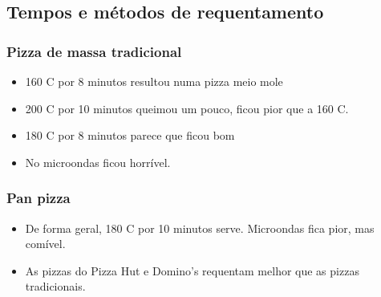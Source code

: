\subsection*{Tempos e métodos de requentamento}

\subsubsection*{Pizza de massa tradicional}
\begin{itemize}
	\item 160 \grau C por 8 minutos resultou numa pizza meio mole
	\item 200 \grau C por 10 minutos queimou um pouco, ficou pior que a 160 \grau C.
	\item 180 \grau C por 8 minutos parece que ficou bom
	\item No microondas ficou horrível.
\end{itemize}

\subsubsection*{Pan pizza}
\begin{itemize}
	\item De forma geral, 180 \grau C por 10 minutos serve. Microondas fica pior, mas comível.
	\item As pizzas do Pizza Hut e Domino's requentam melhor que as pizzas tradicionais.
\end{itemize}


